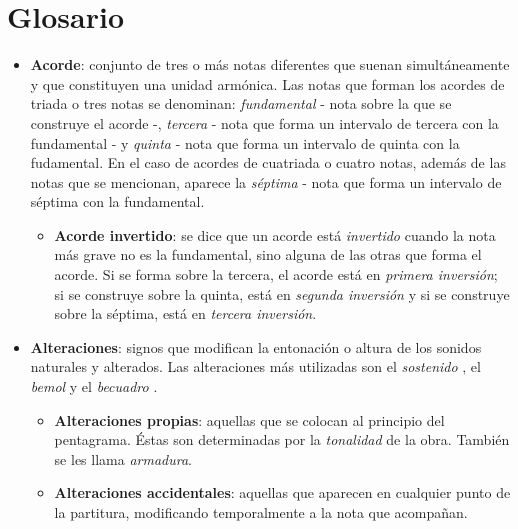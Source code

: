 \chapter*{Glosario}


\begin{itemize}[label={}, leftmargin=*]

	\item \textbf{Acorde}: conjunto de tres o más notas diferentes que suenan simultáneamente y que constituyen una unidad armónica. Las notas que forman los acordes de triada o tres notas se denominan: \textit{fundamental} - nota sobre la que se construye el acorde -,  \textit{tercera} - nota que forma un intervalo de tercera con la fundamental - y \textit{quinta} - nota que forma un intervalo de quinta con la fudamental. En el caso de acordes de cuatriada o cuatro notas, además de las notas que se mencionan, aparece la \textit{séptima} - nota que forma un intervalo de séptima con la fundamental.

	\begin{itemize}

			\item \textbf{Acorde invertido}: se dice que un acorde está \textit{invertido} cuando la nota más grave no es la fundamental, sino alguna de las otras que forma el acorde. Si se forma sobre la tercera, el acorde está en \textit{primera inversión}; si se construye sobre la quinta, está en \textit{segunda inversión} y si se construye sobre la séptima, está en \textit{tercera inversión}.

	\end{itemize}

	\bigskip

	\item \textbf{Alteraciones}: signos que modifican la entonación o altura de los sonidos naturales y alterados. Las alteraciones más utilizadas son el \textit{sostenido} \sharp{} , el \textit{bemol} \flat{} y el \textit{becuadro} \natural{}. 

	\begin{itemize}

		\item \textbf{Alteraciones propias}: aquellas que se colocan al principio del pentagrama. Éstas son determinadas por la \textit{tonalidad} de la obra. También se les llama \textit{armadura}.

		\item \textbf{Alteraciones accidentales}: aquellas que aparecen en cualquier punto de la partitura, modificando temporalmente a la nota que acompañan.


\end{itemize}
\end{itemize}
